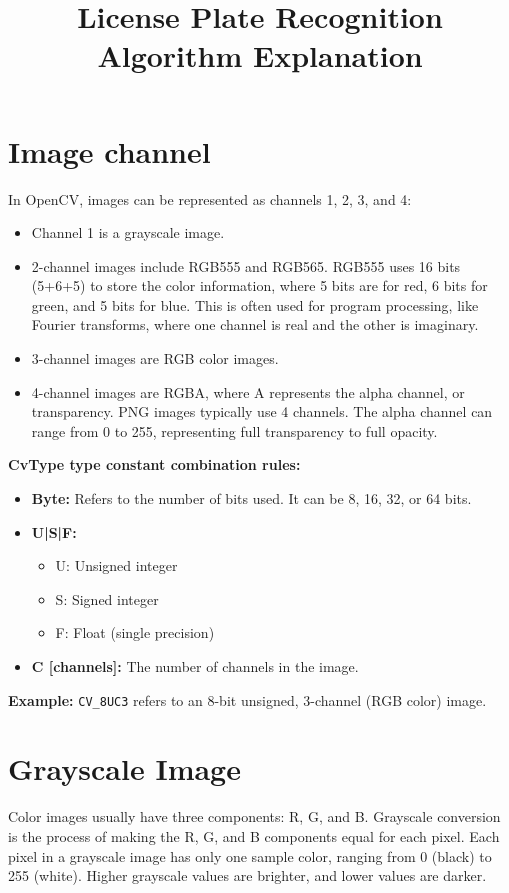 \documentclass{article}
\title{License Plate Recognition Algorithm Explanation}
\author{}
\date{}
\begin{document}
	
	\maketitle
	
	\section{Image channel}
	In OpenCV, images can be represented as channels 1, 2, 3, and 4:
	\begin{itemize}
		\item Channel 1 is a grayscale image.
		\item 2-channel images include RGB555 and RGB565. RGB555 uses 16 bits (5+6+5) to store the color information, where 5 bits are for red, 6 bits for green, and 5 bits for blue. This is often used for program processing, like Fourier transforms, where one channel is real and the other is imaginary.
		\item 3-channel images are RGB color images.
		\item 4-channel images are RGBA, where A represents the alpha channel, or transparency. PNG images typically use 4 channels. The alpha channel can range from 0 to 255, representing full transparency to full opacity.
	\end{itemize}
	
	\textbf{CvType type constant combination rules:}
	\begin{itemize}
		\item \textbf{Byte:} Refers to the number of bits used. It can be 8, 16, 32, or 64 bits.
		\item \textbf{U|S|F:}
		\begin{itemize}
			\item U: Unsigned integer
			\item S: Signed integer
			\item F: Float (single precision)
		\end{itemize}
		\item \textbf{C [channels]:} The number of channels in the image.
	\end{itemize}
	\textbf{Example:} \texttt{CV\_8UC3} refers to an 8-bit unsigned, 3-channel (RGB color) image.
	
	\section{Grayscale Image}
	Color images usually have three components: R, G, and B. Grayscale conversion is the process of making the R, G, and B components equal for each pixel. Each pixel in a grayscale image has only one sample color, ranging from 0 (black) to 255 (white). Higher grayscale values are brighter, and lower values are darker.
	
\end{document}
